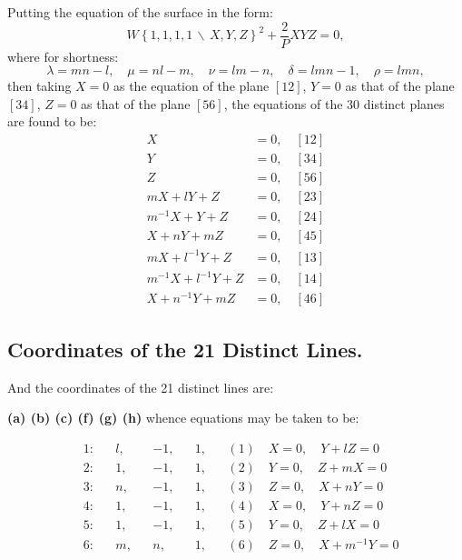 \documentclass[11pt,a4paper]{article}
\begin{document}
Putting the equation of the surface in the form:
\begin{equation*}
W\left\{1, 1, 1, 1 \,\backslash\, X, Y, Z\right\}^2 + \frac{2}{P}XYZ = 0,
\end{equation*}
where for shortness:
\begin{equation*}
\lambda = mn - l, \quad \mu = nl - m, \quad \nu = lm - n, \quad \delta = lmn - 1, \quad \rho = lmn,
\end{equation*}
then taking $X = 0$ as the equation of the plane $[12]$, $Y = 0$ as that of the plane $[34]$, $Z = 0$ as that of the plane $[56]$, the equations of the 30 distinct planes are found to be:
\begin{align*}
X &= 0, \quad [12] \\
Y &= 0, \quad [34] \\
Z &= 0, \quad [56] \\
mX + lY + Z &= 0, \quad [23] \\
m^{-1}X + Y + Z &= 0, \quad [24] \\
X + nY + mZ &= 0, \quad [45] \\
mX + l^{-1}Y + Z &= 0, \quad [13] \\
m^{-1}X + l^{-1}Y + Z &= 0, \quad [14] \\
X + n^{-1}Y + mZ &= 0, \quad [46]
\end{align*}

\subsection*{Coordinates of the 21 Distinct Lines.}

And the coordinates of the 21 distinct lines are:

\begin{center}
\textbf{(a) (b) (c) (f) (g) (h)} whence equations may be taken to be:
\end{center}
\begin{align*}
&1: && l, && -1, && 1, && (1) \quad X = 0, \quad Y + lZ = 0 \\
&2: && 1, && -1, && 1, && (2) \quad Y = 0, \quad Z + mX = 0 \\
&3: && n, && -1, && 1, && (3) \quad Z = 0, \quad X + nY = 0 \\
&4: && 1, && -1, && 1, && (4) \quad X = 0, \quad Y + nZ = 0 \\
&5: && 1, && -1, && 1, && (5) \quad Y = 0, \quad Z + lX = 0 \\
&6: && m, && n, && 1, && (6) \quad Z = 0, \quad X + m^{-1}Y = 0
\end{align*}
\end{document}
